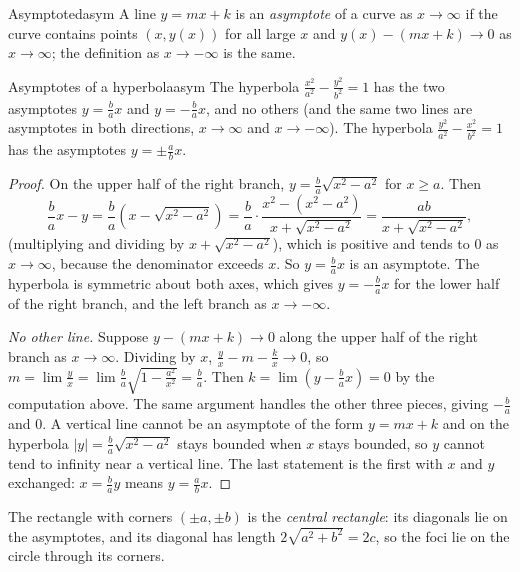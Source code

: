 \documentclass[11pt]{article}
\begin{document}
\begin{defn}{Asymptote}{dasym}
A line $y=mx+k$ is an \emph{asymptote} of a curve as $x\to\infty$ if the curve contains points $(x,y(x))$ for all large $x$ and $y(x)-(mx+k)\to0$ as $x\to\infty$; the definition as $x\to-\infty$ is the same.
\end{defn}

\begin{thm}{Asymptotes of a hyperbola}{asym}
The hyperbola $\frac{x^2}{a^2}-\frac{y^2}{b^2}=1$ has the two asymptotes $y=\frac bax$ and $y=-\frac bax$, and no others (and the same two lines are asymptotes in both directions, $x\to\infty$ and $x\to-\infty$). The hyperbola $\frac{y^2}{a^2}-\frac{x^2}{b^2}=1$ has the asymptotes $y=\pm\frac abx$.
\end{thm}
\begin{proof}
On the upper half of the right branch, $y=\frac ba\sqrt{x^2-a^2}$ for $x\ge a$. Then
\[
\frac bax-y=\frac ba\left(x-\sqrt{x^2-a^2}\right)=\frac ba\cdot\frac{x^2-\left(x^2-a^2\right)}{x+\sqrt{x^2-a^2}}=\frac{ab}{x+\sqrt{x^2-a^2}},
\]
(multiplying and dividing by $x+\sqrt{x^2-a^2}$), which is positive and tends to $0$ as $x\to\infty$, because the denominator exceeds $x$. So $y=\frac bax$ is an asymptote. The hyperbola is symmetric about both axes, which gives $y=-\frac bax$ for the lower half of the right branch, and the left branch as $x\to-\infty$.

\emph{No other line.} Suppose $y-(mx+k)\to0$ along the upper half of the right branch as $x\to\infty$. Dividing by $x$, $\frac yx-m-\frac kx\to0$, so $m=\lim\frac yx=\lim\frac ba\sqrt{1-\frac{a^2}{x^2}}=\frac ba$. Then $k=\lim\left(y-\frac bax\right)=0$ by the computation above. The same argument handles the other three pieces, giving $-\frac ba$ and $0$. A vertical line cannot be an asymptote of the form $y=mx+k$ and on the hyperbola $\lvert y\rvert=\frac ba\sqrt{x^2-a^2}$ stays bounded when $x$ stays bounded, so $y$ cannot tend to infinity near a vertical line. The last statement is the first with $x$ and $y$ exchanged: $x=\frac ba y$ means $y=\frac abx$.
\end{proof}

The rectangle with corners $(\pm a,\pm b)$ is the \emph{central rectangle}: its diagonals lie on the asymptotes, and its diagonal has length $2\sqrt{a^2+b^2}=2c$, so the foci lie on the circle through its corners.
\end{document}
